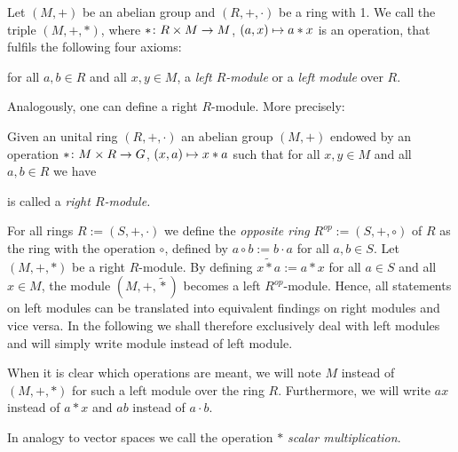 \begin{defin} Let $(M,+)$ be an abelian group and $(R,+,\cdot)$ be a ring with 1. We call the triple $(M,+,\ast)$, where $\ast\colon R\times M\rightarrow M$, $(a,x)\mapsto a\ast x$ is an operation, that fulfils the following four axioms:
\begin{multienumerate}
\end{multienumerate}
for all $a,b \in R$ and all $x,y \in M$, a \emph{left $R$-module} or a \textit{left module} over $R$.
\end{defin}

Analogously, one can define a right $R$-module. More precisely:

Given an unital ring $(R,+,\cdot)$ an abelian group $(M,+)$ endowed by an operation $\ast\colon M \times R \rightarrow G$, $(x,a)\mapsto x\ast a$ such that for all $x,y\in M$ and all $a,b\in R$ we have
\begin{multienumerate}
\end{multienumerate}
is called a \emph{right $R$-module.}

\begin{rem}
\begin{exlist}
\item For all rings $R:=(S,+,\cdot)$ we define the \textit{opposite ring} $R^{op}:=(S,+,\circ)$ of $R$ as the ring with the operation $\circ$, defined by $a\circ b:= b\cdot a$ for all $a,b \in S$. Let $(M,+,\ast)$ be a right $R$-module.
By defining $x\tilde{\ast}a:=a\ast x$ for all $a\in S$ and all $x\in M$, the module $(M,+,\tilde{\ast})$ becomes a left $R^{op}$-module.
Hence, all statements on left modules can be translated into equivalent findings on right modules and vice versa.
In the following we shall therefore exclusively deal with left modules and will simply write module instead of left module.
\item When it is clear which operations are meant, we will note $M$ instead of $(M,+,\ast)$ for such a left module over the ring $R$.
Furthermore, we will write $ax$ instead of $a\ast x$ and $ab$ instead of $a\cdot b$.
\item In analogy to vector spaces we call the operation $\ast$ \emph{scalar multiplication}.
\end{exlist}
\end{rem}

